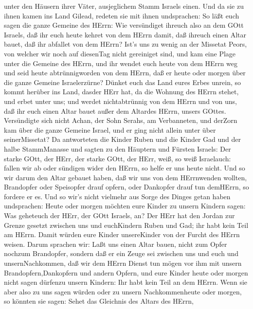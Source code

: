 unter den Häusern ihrer Väter, ausjeglichem Stamm Israels einen.
 Und da sie zu ihnen kamen ins Land Gilead, redeten sie mit
ihnen undsprachen:  So läßt euch sagen die ganze Gemeine
des HErrn: Wie versündiget ihreuch also an dem GOtt Israels, daß ihr
euch heute kehret von dem HErrn damit, daß ihreuch einen Altar bauet,
daß ihr abfallet von dem HErrn?  Ist's uns zu wenig an der
Missetat Peors, von welcher wir noch auf diesenTag nicht gereiniget
sind, und kam eine Plage unter die Gemeine des HErrn,  und
ihr wendet euch heute von dem HErrn weg und seid heute abtrünnigworden
von dem HErrn, daß er heute oder morgen über die ganze Gemeine
Israelerzürne?  Dünket euch das Land eures Erbes unrein, so
kommt herüber ins Land, dasder HErr hat, da die Wohnung des HErrn
stehet, und erbet unter uns; und werdet nichtabtrünnig von dem HErrn und
von uns, daß ihr euch einen Altar bauet außer dem Altardes HErrn, unsers
GOttes.  Versündigte sich nicht Achan, der Sohn Serahs, am
Verbanneten, und derZorn kam über die ganze Gemeine Israel, und er ging
nicht allein unter über seinerMissetat?  Da antworteten die
Kinder Ruben und die Kinder Gad und der halbe StammManasse und sagten zu
den Häuptern und Fürsten Israels:  Der starke GOtt, der
HErr, der starke GOtt, der HErr, weiß, so weiß Israelauch: fallen wir ab
oder sündigen wider den HErrn, so helfe er uns heute nicht.
 Und so wir darum den Altar gebauet haben, daß wir uns von
dem HErrnwenden wollten, Brandopfer oder Speisopfer drauf opfern, oder
Dankopfer drauf tun demHErrn, so fordere er es.  Und so
wir's nicht vielmehr aus Sorge des Dinges getan haben undsprachen: Heute
oder morgen möchten eure Kinder zu unsern Kindern sagen: Was geheteuch
der HErr, der GOtt Israels, an?  Der HErr hat den Jordan
zur Grenze gesetzt zwischen uns und euchKindern Ruben und Gad; ihr habt
kein Teil am HErrn. Damit würden eure Kinder unsereKinder von der Furcht
des HErrn weisen.  Darum sprachen wir: Laßt uns einen Altar
bauen, nicht zum Opfer nochzum Brandopfer,  sondern daß er
ein Zeuge sei zwischen uns und euch und unsernNachkommen, daß wir dem
HErrn Dienst tun mögen vor ihm mit unsern Brandopfern,Dankopfern und
andern Opfern, und eure Kinder heute oder morgen nicht sagen dürfenzu
unsern Kindern: Ihr habt kein Teil an dem HErrn.  Wenn sie
aber also zu uns sagen würden oder zu unsern Nachkommenheute oder
morgen, so könnten sie sagen: Sehet das Gleichnis des Altars des HErrn,

